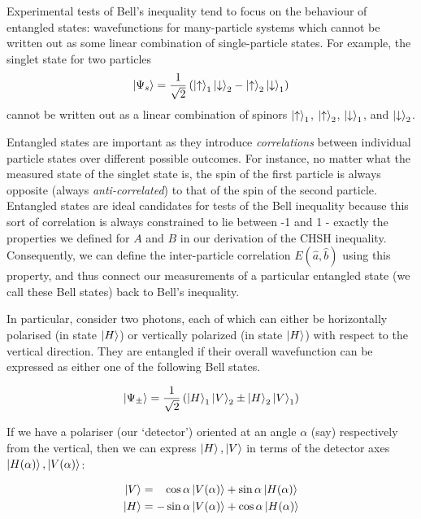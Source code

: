 \documentclass[aps,prl,nofootinbib,twocolumn,superscriptaddress,groupedaddress]{revtex4}  %
\begin{document}
Experimental tests of Bell's inequality tend to focus on the behaviour of entangled states: wavefunctions for many-particle systems which cannot be written out as some linear combination of single-particle states. For example, the singlet state for two particles 
\begin{equation}
\ket{\Psi_{s}} = \dfrac{1}{\sqrt{2}}\left(\ket{\uparrow}_{1}\ket{\downarrow}_{2} - \ket{\uparrow}_{2}\ket{\downarrow}_{1}\right)
\end{equation}
cannot be written out as a linear combination of spinors $\ket{\uparrow}_{1}$, $\ket{\uparrow}_{2}$, $\ket{\downarrow}_{1}$, and $\ket{\downarrow}_{2}$. 

Entangled states are important as they introduce \textsl{correlations} between individual particle states over different possible outcomes. For instance, no matter what the measured state of the singlet state is, the spin of the first particle is always opposite (always \textit{anti-correlated}) to that of the spin of the second particle. Entangled states are ideal candidates for tests of the Bell inequality because this sort of correlation is always constrained to lie between -1 and 1 - exactly the properties we defined for $A$ and $B$ in our derivation of the CHSH inequality. Consequently, we can define the inter-particle correlation $E(\hat{a},\hat{b})$ using this property, and thus connect our measurements of a particular entangled state (we call these Bell states) back to Bell's inequality.

In particular, consider two photons, each of which can either be horizontally polarised (in state $\ket{H}$) or vertically polarized (in state $\ket{H}$) with respect to the vertical direction. They are entangled if their overall wavefunction can be expressed as either one of the following Bell states.

\begin{equation}
\ket{\Psi_{\pm}} = \dfrac{1}{\sqrt{2}}\left(\ket{H}_{1}\ket{V}_{2} \pm \ket{H}_{2}\ket{V}_{1}\right)
\end{equation}

If we have a polariser (our `detector') oriented at an angle $\alpha$ (say) respectively from the vertical, then we can express $\ket{H}, \ket{V}$ in terms of the detector axes $\ket{H(\alpha)}, \ket{V(\alpha)}$:

\begin{align}
\ket{V} &= \;\;\;\cos{\alpha}\ket{V(\alpha)}+\sin{\alpha}\ket{H(\alpha)}\\
\ket{H} &= -\sin{\alpha}\ket{V(\alpha)}+\cos{\alpha}\ket{H(\alpha)}
\end{align}
\end{document}

